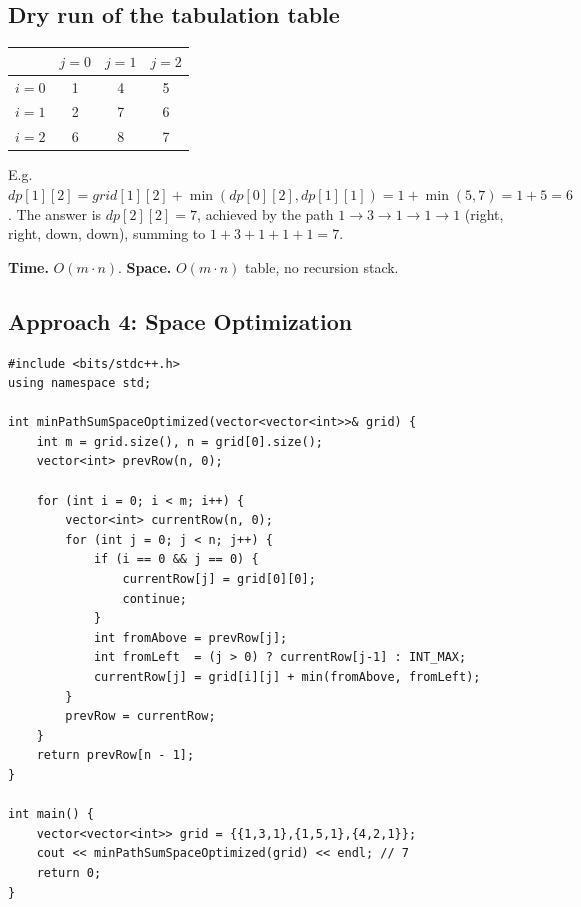\subsection*{Dry run of the tabulation table}


\begin{center}
\begin{tabular}{c|c|c|c}
 & $j=0$ & $j=1$ & $j=2$ \\ \hline
$i=0$ & 1 & 4 & 5 \\ \hline
$i=1$ & 2 & 7 & 6 \\ \hline
$i=2$ & 6 & 8 & 7
\end{tabular}
\end{center}

E.g.\ $\textit{dp}[1][2] = \textit{grid}[1][2] + \min(\textit{dp}[0][2],
\textit{dp}[1][1]) = 1+\min(5,7) = 1+5=6$. The answer is
$\textit{dp}[2][2]=7$, achieved by the path $1\to3\to1\to1\to1$ (right,
right, down, down), summing to $1+3+1+1+1=7$.

\begin{complexitybox}
\textbf{Time.} $O(m \cdot n)$.
\textbf{Space.} $O(m \cdot n)$ table, no recursion stack.
\end{complexitybox}

\subsection*{Approach 4: Space Optimization}

\begin{lstlisting}
#include <bits/stdc++.h>
using namespace std;

int minPathSumSpaceOptimized(vector<vector<int>>& grid) {
    int m = grid.size(), n = grid[0].size();
    vector<int> prevRow(n, 0);

    for (int i = 0; i < m; i++) {
        vector<int> currentRow(n, 0);
        for (int j = 0; j < n; j++) {
            if (i == 0 && j == 0) {
                currentRow[j] = grid[0][0];
                continue;
            }
            int fromAbove = prevRow[j];
            int fromLeft  = (j > 0) ? currentRow[j-1] : INT_MAX;
            currentRow[j] = grid[i][j] + min(fromAbove, fromLeft);
        }
        prevRow = currentRow;
    }
    return prevRow[n - 1];
}

int main() {
    vector<vector<int>> grid = {{1,3,1},{1,5,1},{4,2,1}};
    cout << minPathSumSpaceOptimized(grid) << endl; // 7
    return 0;
}
\end{lstlisting}


